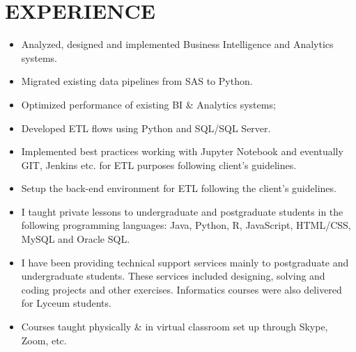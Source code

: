 \section{EXPERIENCE}

{
{\begin{flushleft}
\begin{itemize}
  \item Analyzed, designed and implemented Business Intelligence and Analytics systems.
  \item Migrated existing data pipelines from SAS to Python.
  \item Optimized performance of existing BI & Analytics systems;
  \item Developed ETL flows using Python and SQL/SQL Server.
  \item Implemented best practices working with Jupyter Notebook and eventually GIT, Jenkins etc. for ETL purposes following client’s guidelines.
  \item Setup the back-end environment for ETL following the client’s guidelines.
\end{itemize} 
\end{flushleft} } } 

{
{\begin{flushleft}
\begin{itemize}
  \item I taught private lessons to undergraduate and postgraduate students in the following programming languages: Java, Python, R, JavaScript, HTML/CSS, MySQL and Oracle SQL. 
  \item I have been providing technical support services mainly to postgraduate and undergraduate students. These services included designing, solving and coding projects and other exercises. Informatics courses were also delivered for Lyceum students.  
  \item Courses taught physically \& in virtual classroom set up through Skype, Zoom, etc.
\end{itemize} 
\end{flushleft} } } 

